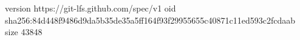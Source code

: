 version https://git-lfs.github.com/spec/v1
oid sha256:84d448f9486d9da5b35de35a5ff164f93f29955655c40871c11ed593c2fcdaab
size 43848
